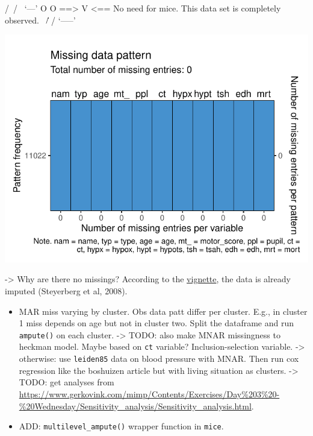 \documentclass[
]{jss}
\begin{document}
\begin{CodeChunk}
\begin{CodeOutput}
 /\     /\
{  `---'  }
{  O   O  }
==>  V <==  No need for mice. This data set is completely observed.
 \  \|/  /
  `-----'
\end{CodeOutput}


\begin{center}\includegraphics{Manuscript_files/figure-latex/impact-1} \end{center}

\end{CodeChunk}

-\textgreater{} Why are there no missings? According to the
\href{https://cran.r-project.org/web/packages/metamisc/metamisc.pdf}{vignette},
the data is already imputed (Steyerberg et al, 2008).

\begin{itemize}
\item
  MAR miss varying by cluster. Obs data patt differ per cluster. E.g.,
  in cluster 1 miss depends on age but not in cluster two. Split the
  dataframe and run \texttt{ampute()} on each cluster. -\textgreater{}
  TODO: also make MNAR missingness to heckman model. Maybe based on
  \texttt{ct} variable? Inclusion-selection variable. -\textgreater{}
  otherwise: use \texttt{leiden85} data on blood pressure with MNAR.
  Then run cox regression like the boshuizen article but with living
  situation as clusters. -\textgreater{} TODO: get analyses from
  \url{https://www.gerkovink.com/mimp/Contents/Exercises/Day\%203\%20-\%20Wednesday/Sensitivity_analysis/Sensitivity_analysis.html}.
\item
  ADD: \texttt{multilevel\_ampute()} wrapper function in \texttt{mice}.
\end{itemize}
\end{document}
